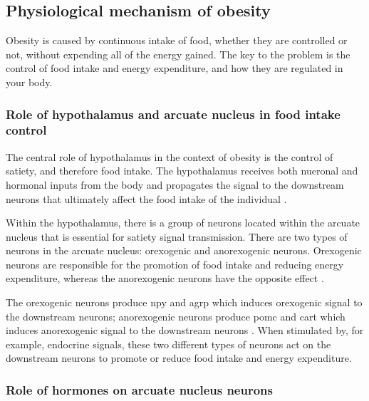 \subsection{Physiological mechanism of obesity}
\label{sub:physiological_mechanism_of_obesity}

Obesity is caused by continuous intake of food, whether they are controlled or not, without expending all of the energy gained.
The key to the problem is the control of food intake and energy expenditure, and how they are regulated in your body.

\subsubsection{Role of hypothalamus and arcuate nucleus in food intake control}
\label{ssub:role_of_hypothalamus_and_arcuate_nucleus_in_food_intake_control}

The central role of hypothalamus in the context of obesity is the control of satiety, and therefore food intake.
The hypothalamus receives both nueronal and hormonal inputs from the body and propagates the signal to the downstream neurons that ultimately affect the food intake of the individual \citep{Bell2005, Spiegelman2001}.

Within the hypothalamus, there is a group of neurons located within the arcuate nucleus that is essential for satiety signal transmission.
There are two types of neurons in the arcuate nucleus: orexogenic and anorexogenic neurons.
Orexogenic neurons are responsible for the promotion of food intake and reducing energy expenditure, whereas the anorexogenic neurons have the opposite effect \citep{Barsh2002}.

The orexogenic neurons produce \gls{npy} and \gls{agrp} which induces orexogenic signal to the downstream neurons; anorexogenic neurons produce \gls{pomc} and \gls{cart} which induces anorexogenic signal to the downstream neurons \citep{Barsh2002, Spiegelman2001}.
When stimulated by, for example, endocrine signals, these two different types of neurons act on the downstream neurons to promote or reduce food intake and energy expenditure.

\subsubsection{Role of hormones on arcuate nucleus neurons}
\label{ssub:role_of_hormones_on_arcuate_nucleus_neurons}




